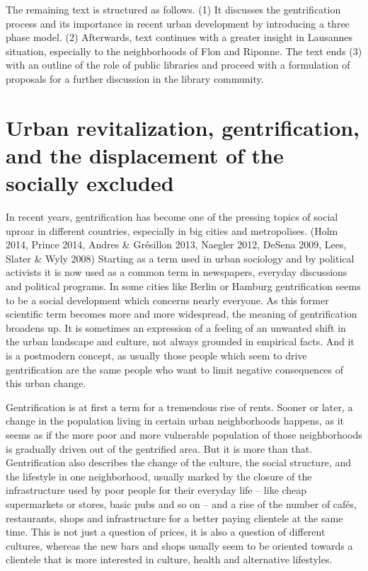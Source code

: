 \documentclass[a4paper,
fontsize=11pt,
oneside,
numbers=noperiodatend,
parskip=half-,
bibliography=totoc,
final
]{scrartcl}
\begin{document}
The remaining text is structured as follows. (1) It discusses the
gentrification process and its importance in recent urban development by
introducing a three phase model. (2) Afterwards, text continues with a
greater insight in Lausannes situation, especially to the neighborhoods
of Flon and Riponne. The text ends (3) with an outline of the role of
public libraries and proceed with a formulation of proposals for a
further discussion in the library community.

\section{Urban revitalization, gentrification, and the
displacement of the socially
excluded}\label{urban-revitalization-gentrification-and-the-displacement-of-the-socially-excluded}

In recent years, gentrification has become one of the pressing topics of
social uproar in different countries, especially in big cities and
metropolises. (Holm 2014, Prince 2014, Andres \& Grésillon 2013, Naegler
2012, DeSena 2009, Lees, Slater \& Wyly 2008) Starting as a term used in
urban sociology and by political activists it is now used as a common
term in newspapers, everyday discussions and political programs. In some
cities like Berlin or Hamburg gentrification seems to be a social
development which concerns nearly everyone. As this former scientific
term becomes more and more widespread, the meaning of gentrification
broadens up. It is sometimes an expression of a feeling of an unwanted
shift in the urban landscape and culture, not always grounded in
empirical facts. And it is a postmodern concept, as usually those people
which seem to drive gentrification are the same people who want to limit
negative consequences of this urban change.

Gentrification is at first a term for a tremendous rise of rents. Sooner
or later, a change in the population living in certain urban
neighborhoods happens, as it seems as if the more poor and more
vulnerable population of those neighborhoods is gradually driven out of
the gentrified area. But it is more than that. Gentrification also
describes the change of the culture, the social structure, and the
lifestyle in one neighborhood, usually marked by the closure of the
infrastructure used by poor people for their everyday life -- like cheap
supermarkets or stores, basic pubs and so on -- and a rise of the number
of cafés, restaurants, shops and infrastructure for a better paying
clientele at the same time. This is not just a question of prices, it is
also a question of different cultures, whereas the new bars and shops
usually seem to be oriented towards a clientele that is more interested
in culture, health and alternative lifestyles.
\end{document}
